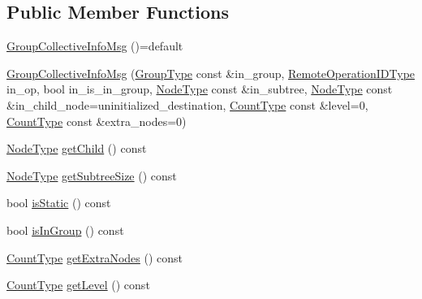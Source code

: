 \subsection*{Public Member Functions}
\begin{DoxyCompactItemize}
\item 
\hyperlink{structvt_1_1group_1_1_group_collective_info_msg_a92fdcd49062ed34fdb873b10e33e06f1}{Group\+Collective\+Info\+Msg} ()=default
\item 
\hyperlink{structvt_1_1group_1_1_group_collective_info_msg_acac57af50d715f4fadcceda26dee5d4f}{Group\+Collective\+Info\+Msg} (\hyperlink{namespacevt_a27b5e4411c9b6140c49100e050e2f743}{Group\+Type} const \&in\+\_\+group, \hyperlink{namespacevt_1_1group_a73f2624ddeb535b39a08b6524f26b244}{Remote\+Operation\+I\+D\+Type} in\+\_\+op, bool in\+\_\+is\+\_\+in\+\_\+group, \hyperlink{namespacevt_a866da9d0efc19c0a1ce79e9e492f47e2}{Node\+Type} const \&in\+\_\+subtree, \hyperlink{namespacevt_a866da9d0efc19c0a1ce79e9e492f47e2}{Node\+Type} const \&in\+\_\+child\+\_\+node=uninitialized\+\_\+destination, \hyperlink{structvt_1_1group_1_1_group_collective_info_msg_a3d20316314d3cc3ac13ff4c5250203a5}{Count\+Type} const \&level=0, \hyperlink{structvt_1_1group_1_1_group_collective_info_msg_a3d20316314d3cc3ac13ff4c5250203a5}{Count\+Type} const \&extra\+\_\+nodes=0)
\item 
\hyperlink{namespacevt_a866da9d0efc19c0a1ce79e9e492f47e2}{Node\+Type} \hyperlink{structvt_1_1group_1_1_group_collective_info_msg_a5e4adf90fa896fbb82b80b72edefc7d4}{get\+Child} () const
\item 
\hyperlink{namespacevt_a866da9d0efc19c0a1ce79e9e492f47e2}{Node\+Type} \hyperlink{structvt_1_1group_1_1_group_collective_info_msg_a84b8680a55f3eb8db6f775d2facb2814}{get\+Subtree\+Size} () const
\item 
bool \hyperlink{structvt_1_1group_1_1_group_collective_info_msg_a9d886cc20ca198b4b99914c811414c9d}{is\+Static} () const
\item 
bool \hyperlink{structvt_1_1group_1_1_group_collective_info_msg_a890e4479caa27be0752bbfef967d23db}{is\+In\+Group} () const
\item 
\hyperlink{structvt_1_1group_1_1_group_collective_info_msg_a3d20316314d3cc3ac13ff4c5250203a5}{Count\+Type} \hyperlink{structvt_1_1group_1_1_group_collective_info_msg_af573fdf277066cbd0e7337503177a467}{get\+Extra\+Nodes} () const
\item 
\hyperlink{structvt_1_1group_1_1_group_collective_info_msg_a3d20316314d3cc3ac13ff4c5250203a5}{Count\+Type} \hyperlink{structvt_1_1group_1_1_group_collective_info_msg_a368f82322f36599841188bfe9fb8d4e6}{get\+Level} () const
\end{DoxyCompactItemize}



